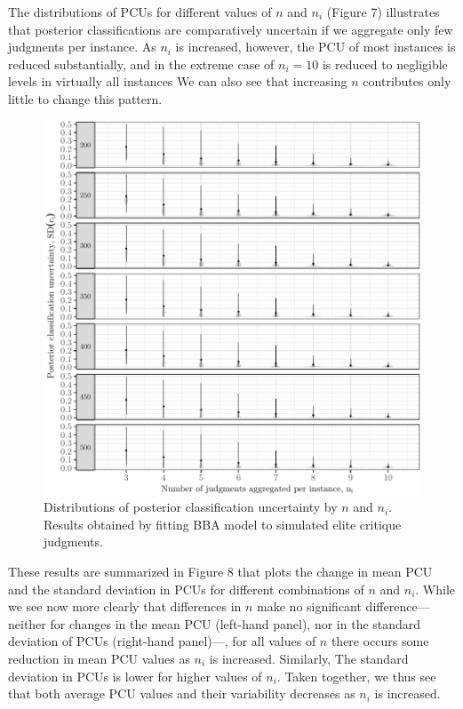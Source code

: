 \documentclass[12pt,]{article}
\begin{document}
The distributions of PCUs for different values of \(n\) and \(n_i\)
(Figure 7) illustrates that posterior classifications are comparatively
uncertain if we aggregate only few judgments per instance. As \(n_i\) is
increased, however, the PCU of most instances is reduced substantially,
and in the extreme case of \(n_i = 10\) is reduced to negligible levels
in virtually all instances We can also see that increasing \(n\)
contributes only little to change this pattern.

\begin{figure}[H]

{\centering \includegraphics{licht_2019_evaluating_crowdsourced_elite_critique_codings_files/figure-latex/sim_pcu_distributions-1} 

}

\caption{Distributions of posterior classification uncertainty by $n$ and $n_i$. Results obtained by fitting BBA model to simulated elite critique judgments.}\label{fig:sim_pcu_distributions}
\end{figure}

These results are summarized in Figure 8 that plots the change in mean
PCU and the standard deviation in PCUs for different combinations of
\(n\) and \(n_i\). While we see now more clearly that differences in
\(n\) make no significant difference---neither for changes in the mean
PCU (left-hand panel), nor in the standard deviation of PCUs (right-hand
panel)---, for all values of \(n\) there occurs some reduction in mean
PCU values as \(n_i\) is increased. Similarly, The standard deviation in
PCUs is lower for higher values of \(n_i\). Taken together, we thus see
that both average PCU values and their variability decreases as \(n_i\)
is increased.
\end{document}
